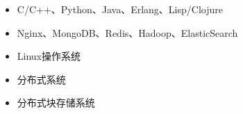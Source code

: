   \begin{itemize}[leftmargin=*]
    \item C/C++、Python、Java、Erlang、Lisp/Clojure
    \item Nginx、MongoDB、Redis、Hadoop、ElasticSearch
    \item Linux操作系统
    \item 分布式系统
    \item 分布式块存储系统
  \end{itemize}
